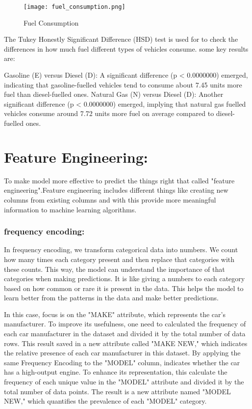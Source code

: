 \documentclass[12pt, a4paper,oneside]{book}
\numberwithin{equation}{section}
\begin{document}
\begin{figure}[H]
\centerline{\texttt{[image: fuel\_consumption.png]}}
\caption{Fuel Consumption}
\label{fig:4.2}
\end{figure}


The Tukey Honestly Significant Difference (HSD) test is used for to check the differences in how much fuel different types of vehicles consume.
some key results are:

Gasoline (E) versus Diesel (D): A significant difference (p < 0.0000000) emerged, indicating that gasoline-fuelled vehicles tend to consume about 7.45 units more fuel than diesel-fuelled ones.
Natural Gas (N) versus Diesel (D): Another significant difference (p < 0.0000000) emerged, implying that natural gas fuelled vehicles consume around 7.72 units more fuel on average compared to diesel-fuelled ones.   




\section{Feature Engineering:}

To make model more effective to predict the things right that called "feature engineering".Feature engineering includes different things like creating new columns from existing columns and with this provide more meaningful information to machine learning algorithms.


\subsubsection{frequency encoding:}

In frequency encoding, we transform categorical data into numbers. We count how many times each category present and then replace that categories with these counts. This way, the model can understand the importance of that categories when making predictions. It is like giving a numbers to each category based on how common or rare it is present in the data. This helps the model to learn better from the patterns in the data and make better predictions.~\cite{ref19}


In this case, focus is  on the "MAKE" attribute, which represents the car's manufacturer. To improve its usefulness, one need to calculated the frequency of each car manufacturer in the dataset and divided it by the total number of data rows. This result saved in a new attribute called "MAKE NEW," which indicates the relative presence of each car manufacturer in this dataset.
By applying the same Frequency Encoding to the "MODEL" column, indicates whether the car has a high-output engine. To enhance its representation, this calculate the frequency of each unique value in the "MODEL" attribute and divided it by the total number of data points. The result is a new attribute named "MODEL NEW," which quantifies the prevalence of each "MODEL" category.
\end{document}
